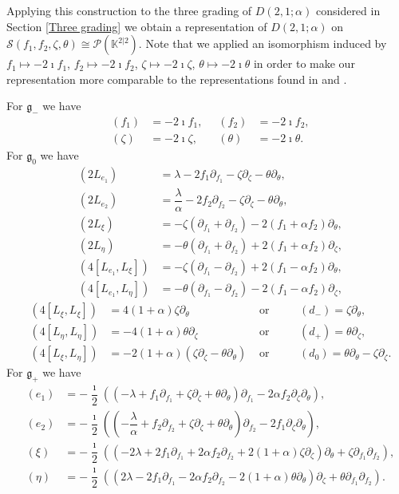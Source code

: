 \documentclass{amsart}
\numberwithin{theorem}{section}
\theoremstyle{definition}
\theoremstyle{remark}
\def\K{\mathds{K} }
\newcommand{\pt}[1]{\partial_{#1}}
\newcommand{\mf}[1]{\mathfrak{#1}}
\newcommand{\mc}[1]{\mathcal{#1}}
\DeclareMathOperator{\pil}{\pi_\lambda}
\begin{document}
Applying this construction to the three grading of $D(2,1;\alpha)$ considered in Section \ref{Three grading} we obtain a representation of $D(2,1;\alpha)$ on $\mc S(f_1,{f_2},\zeta,\theta)\cong \mc P(\K^{2|2})$. Note that we applied an isomorphism induced by $f_1 \mapsto -2\imath f_1$, $f_2 \mapsto -2\imath f_2$, $\zeta \mapsto -2\imath \zeta$, $\theta \mapsto -2\imath \theta$ in order to make our representation more comparable to the representations found in \cite{HKMO} and \cite{BCD}.

For $\mf g_-$ we have
\begin{align*}
\pil(f_1) &= -2\imath f_1, &\pil(f_2) &= -2\imath f_2,\\
\pil(\zeta) &= -2\imath\zeta, &\pil(\theta) &= -2\imath\theta.
\end{align*}
For $\mf g_0$ we have
\begin{align*}
\pil(2L_{e_1}) &=  \lambda -2f_1\pt {f_1} - \zeta \pt \zeta - \theta\pt \theta,\\
\pil(2L_{e_2}) &=  \dfrac{\lambda}{\alpha} -2{f_2}\pt {f_2} - \zeta \pt \zeta - \theta\pt \theta,\\
\pil(2L_{\xi}) &=  -\zeta(\pt {f_1}+\pt {f_2}) - 2(f_1+\alpha {f_2})\pt \theta,\\
\pil(2L_{\eta}) &=  -\theta(\pt {f_1}+\partial_{f_2}) + 2(f_1+\alpha {f_2})\pt \zeta ,\\
\pil(4[L_{e_1},L_{\xi}]) &=  -\zeta(\pt {f_1}-\pt {f_2})+2(f_1 - \alpha {f_2})\pt \theta  ,\\
\pil(4[L_{e_1},L_{\eta}]) &=  -\theta(\pt {f_1} -\pt {f_2})- 2(f_1-\alpha {f_2})\pt \zeta,
\end{align*}
\begin{align*}
\pil(4[L_{\xi},L_{\xi}]) &= 4(1+\alpha)\zeta\pt \theta &\text{ or }\quad &\pil(d_-) = \zeta\pt \theta,\\
\pil(4[L_{\eta},L_{\eta}]) &=  -4(1+\alpha)\theta\pt \zeta &\text{ or }\quad &\pil(d_+) = \theta\pt \zeta,\\
\pil(4[L_{\xi},L_{\eta}]) &=  -2(1+\alpha)(\zeta\pt \zeta -\theta\pt \theta) &\text{ or }\quad &\pil(d_0) = \theta\pt \theta - \zeta\pt \zeta.
\end{align*}
For $\mf g_+$ we have
\begin{align*}
\pil(e_1) &= -\dfrac{\imath}{2}((-\lambda+f_1\pt {f_1} + \zeta\pt \zeta + \theta\pt \theta)\pt {f_1} -2\alpha {f_2} \pt \zeta \pt \theta), \\
\pil(e_2) &= -\dfrac{\imath}{2} ((-\dfrac{\lambda}{\alpha}+{f_2}\pt {f_2} + \zeta\pt \zeta + \theta\pt \theta)\pt {f_2} -2 f_1 \pt \zeta \pt \theta),\\
\pil(\xi) &= -\dfrac{\imath}{2} ((-2\lambda + 2f_1\pt {f_1} + 2\alpha {f_2}\pt {f_2} + 2(1+\alpha)\zeta\pt \zeta)\pt \theta + \zeta \pt {f_1} \pt {f_2}),\\
\pil(\eta) &= -\dfrac{\imath}{2} ((2\lambda - 2f_1\pt {f_1} - 2\alpha {f_2}\pt {f_2} - 2(1+\alpha)\theta\pt \theta)\pt \zeta + \theta \pt {f_1} \pt {f_2}).
\end{align*}
\end{document}
